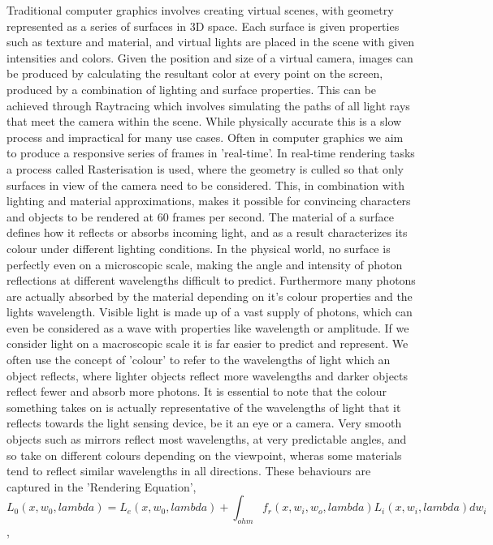 \documentclass[ %
                    author={Gavin Parker},
                supervisor={Dr. Neill Campbell},
                    degree={MEng},
                     title={Deep Siamese Networks for Illumination Estimation from Stereo Images},
                  subtitle={},
                      type={research},
                      year={2018} ]{dissertation}
\begin{document}
\noindent
Traditional computer graphics involves creating virtual scenes, with geometry represented as a series of surfaces in 3D space. Each surface is given properties such as texture and material, and virtual lights are placed in the scene with given intensities and colors. Given the position and size of a virtual camera, images can be produced by calculating the resultant color at every point on the screen, produced by a combination of lighting and surface properties. This can be achieved through Raytracing which involves simulating the paths of all light rays that meet the camera within the scene. While physically accurate this is a slow process and impractical for many use cases. Often in computer graphics we aim to produce a responsive series of frames in 'real-time'. In real-time rendering tasks a process called Rasterisation is used, where the geometry is culled so that only surfaces in view of the camera need to be considered. This, in combination with lighting and material approximations, makes it possible for convincing characters and objects to be rendered at 60 frames per second.
The material of a surface defines how it reflects or absorbs incoming light, and as a result characterizes its colour under different lighting conditions. In the physical world, no surface is perfectly even on a microscopic scale, making the angle and intensity of photon reflections at different wavelengths difficult to predict. Furthermore many photons are actually absorbed by the material depending on it's colour properties and the lights wavelength. Visible light is made up of a vast supply of photons, which can even be considered as a wave with properties like wavelength or amplitude. If we consider light on a macroscopic scale it is far easier to predict and represent. We often use the concept of 'colour' to refer to the wavelengths of light which an object reflects, where lighter objects reflect more wavelengths and darker objects reflect fewer and absorb more photons. It is essential to note that the colour something takes on is actually representative of the wavelengths of light that it reflects towards the light sensing device, be it an eye or a camera. Very smooth objects such as mirrors reflect most wavelengths, at very predictable angles, and so take on different colours depending on the viewpoint, wheras some materials tend to reflect similar wavelengths in all directions. These behaviours are captured in the 'Rendering Equation', 
\[L_0(x, w_0, lambda) = L_e(x, w_0, lambda) + \int_{ohm}{f_r(x, w_i, w_o,lambda)L_i(x, w_i, lambda)dw_i}\],
\end{document}

